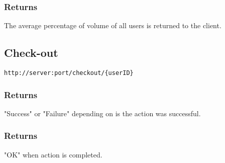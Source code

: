 \subsubsection{Returns}
The average percentage of volume of all users is returned to the client.

\subsection{Check-out}

\begin{lstlisting}[label={lst:endpoint_checkout}, caption={Text surrounded by curly brackets are parameters.}]
http://server:port/checkout/{userID}
\end{lstlisting}

\subsubsection{Returns}
"Success" or "Failure" depending on is the action was successful.

\subsubsection{Returns}
"OK" when action is completed.

